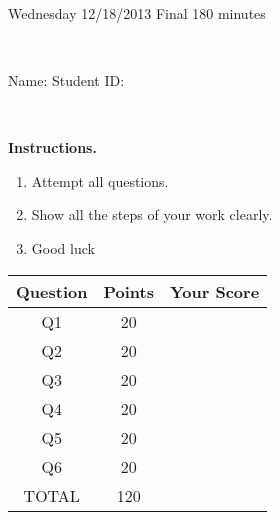 \documentclass[12pt, oneside]{amsart}
\newcommand{\one}{20}
\newcommand{\two}{20}
\newcommand{\three}{20}
\newcommand{\four}{20}
\newcommand{\five}{20}
\newcommand{\six}{20}
\begin{document}
%

\begin{center}
    \hrulefill\\
    {\bf \textsf{\raisebox{-0.10cm}{Fall 2013: MATH 280} \hspace{\fill} 
            \raisebox{-0.10cm}{Numerical Analysis} \hspace{\fill}
            \raisebox{-0.10cm}{David Karapetyan}}}\\
    \hrulefill\\
    {\large \rule{0cm}{1.2cm} \textsf{Wednesday 12/18/2013} \hfill
        \textsf{Final} \hfill  \textsf{180 minutes}}\\
    {\large\rule{0cm}{1.2cm}\textsf{Name: \framebox[2.9in]{\rule{0cm}{0.8cm}} 
            \hspace{\fill}
            Student ID: \framebox[2.1in]{\rule{0cm}{0.8cm}}}}\\
\end{center}
\vspace{0.8cm}

\noindent
{\bf \textsf{Instructions.}}

\begin{enumerate}
    \item Attempt all questions.   
    \item Show all the steps of your work clearly.  
    \item Good luck 
\end{enumerate}

\vfill


\begin{center}
    {\large
        \begin{tabular}{|c|c|c|}
            \hline
            \rule[-0.3cm]{0cm}{1cm}
            \textsf{Question} & \textsf{Points} &  \textsf{Your Score} \\
            \hline
            \hline
            \rule[-0.3cm]{0cm}{1cm}
            \textsf{Q1} & \one &\\
            \hline
            \rule[-0.3cm]{0cm}{1cm}
            \textsf{Q2} & \two &\\
            \hline
            \rule[-0.3cm]{0cm}{1cm}
            \textsf{Q3} & \three &\\
            \hline
            \rule[-0.3cm]{0cm}{1cm}
            \textsf{Q4} & \four &\\
            \hline
            \rule[-0.3cm]{0cm}{1cm}
            \textsf{Q5} & \five &\\
            \hline
            \rule[-0.3cm]{0cm}{1cm}
            \textsf{Q6} & \six &\\
            \hline
            \rule[-0.3cm]{0cm}{1cm}
            \textsf{TOTAL} & 120 & \\
            \hline
        \end{tabular}
    } 

\end{center}
\end{document}
